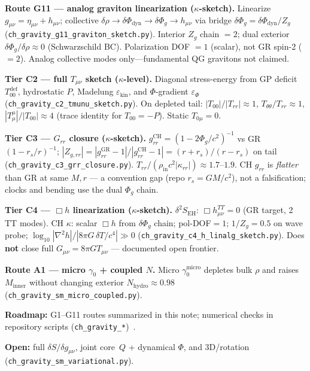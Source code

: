\documentclass[11pt,a4paper]{article}
\begin{document}
\textbf{Route G11 --- analog graviton linearization ($\kappa$-sketch).}
Linearize $g_{\mu\nu}=\eta_{\mu\nu}+h_{\mu\nu}$; collective $\delta\rho\to\delta\Phi_{\mathrm{dyn}}\to\delta\Phi_g\to h_{\mu\nu}$ via bridge $\delta\Phi_g=\delta\Phi_{\mathrm{dyn}}/Z_g$ (\texttt{ch\_gravity\_g11\_graviton\_sketch.py}). Interior $Z_g$ chain $=2$; dual exterior $\delta\Phi_g/\delta\rho\approx 0$ (Schwarzschild BC). Polarization DOF $=1$ (scalar), not GR spin-2 ($=2$). Analog collective modes only---fundamental QG gravitons not claimed.

\textbf{Tier C2 --- full $T_{\mu\nu}$ sketch ($\kappa$-level).}
Diagonal stress-energy from GP deficit $T_{00}^{\mathrm{def}}$, hydrostatic $P$, Madelung $\varepsilon_{\mathrm{kin}}$, and $\Phi$-gradient $\varepsilon_\Phi$ (\texttt{ch\_gravity\_c2\_tmunu\_sketch.py}). On depleted tail: $|T_{00}|/|T_{rr}|\approx 1$, $T_{\theta\theta}/T_{rr}\approx 1$, $|T^\mu_\mu|/|T_{00}|\approx 4$ (trace identity for $T_{00}=-P$). Static $T_{0\mu}=0$.

\textbf{Tier C3 --- $G_{rr}$ closure ($\kappa$-sketch).}
$g_{rr}^{\mathrm{CH}}=(1-2\Phi_g/c^2)^{-1}$ vs GR $(1-r_s/r)^{-1}$; $|Z_{g,rr}|=|g_{rr}^{\mathrm{GR}}-1|/|g_{rr}^{\mathrm{CH}}-1|=(r+r_s)/(r-r_s)$ on tail (\texttt{ch\_gravity\_c3\_grr\_closure.py}). $T_{rr}/(\rho_{\mathrm{in}} c^2|\kappa_{rr}|)\approx 1.7$--$1.9$. CH $g_{rr}$ is \emph{flatter} than GR at same $M,r$ --- a convention gap (repo $r_s=GM/c^2$), not a falsification; clocks and bending use the dual $\Phi_g$ chain.

\textbf{Tier C4 --- $\Box h$ linearization ($\kappa$-sketch).}
$\delta^2 S_{\mathrm{EH}}$: $\Box h_{\mu\nu}^{TT}=0$ (GR target, 2 TT modes). CH $\kappa$: scalar $\Box h$ from $\delta\Phi_g$ chain; pol-DOF$=1$; $1/Z_g=0.5$ on wave probe; $\log_{10}|\nabla^2 h|/|8\pi G\,\delta T/c^4|\gg 0$ (\texttt{ch\_gravity\_c4\_h\_linalg\_sketch.py}). Does \textbf{not} close full $G_{\mu\nu}=8\pi G T_{\mu\nu}$ --- documented open frontier.

\textbf{Route A1 --- micro $\gamma_0$ + coupled $N$.}
Micro $\gamma_0^{\mathrm{micro}}$ depletes bulk $\rho$ and raises $M_{\mathrm{inner}}$ without changing exterior $N_{\mathrm{hydro}}\approx 0.98$ (\texttt{ch\_gravity\_sm\_micro\_coupled.py}).

\textbf{Roadmap:} G1--G11 routes summarized in this note; numerical checks in repository scripts (\texttt{ch\_gravity\_*})~\cite{CHSpaceFabric2026}.

\textbf{Open:} full $\delta S/\delta g_{\mu\nu}$, joint core~$Q$ + dynamical $\Phi$, and 3D/rotation (\texttt{ch\_gravity\_sm\_variational.py}).
\end{document}
